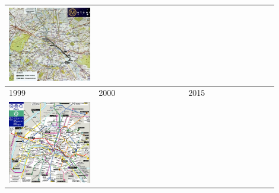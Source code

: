 \begin{tabular}{|m{0.3\linewidth}|m{0.3\linewidth}|m{0.3\linewidth}|}
\includegraphics[width=\linewidth]{img/1991}\\
\hline
1999& 2000 & 2015\\
\includegraphics[width=\linewidth]{img/1999}&

\end{tabular}
